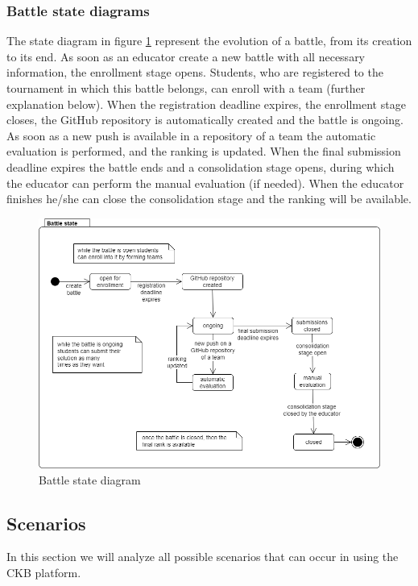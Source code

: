 \subsubsection*{Battle state diagrams}
The state diagram in figure \ref{fig:battle_state} represent the evolution of a battle, from its creation to its end. \newline
As soon as an educator create a new battle with all necessary information, the enrollment stage opens. Students, who are registered to the tournament in which this battle belongs, can enroll with a team (further explanation below). \newline
When the registration deadline expires, the enrollment stage closes, the GitHub repository is automatically created and the battle is ongoing. As soon as a new push is available in a repository of a team the automatic evaluation is performed, and the ranking is updated. \newline
When the final submission deadline expires the battle ends and a consolidation stage opens, during which the educator can perform the manual evaluation (if needed). When the educator finishes he/she can close the consolidation stage and the ranking will be available.
\begin{figure}[H]
    \centering
    \includegraphics[scale=0.5]{images/battle_state.png}
    \caption{Battle state diagram}
    \label{fig:battle_state}
\end{figure}
\clearpage

\subsection{Scenarios}
In this section we will analyze all possible scenarios that can occur in using the CKB platform.

